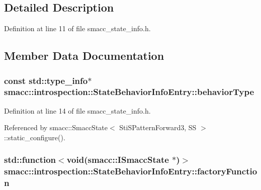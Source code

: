 \subsection{Detailed Description}


Definition at line 11 of file smacc\+\_\+state\+\_\+info.\+h.



\subsection{Member Data Documentation}
\subsubsection[{\texorpdfstring{behavior\+Type}{behaviorType}}]{\setlength{\rightskip}{0pt plus 5cm}const std\+::type\+\_\+info$\ast$ smacc\+::introspection\+::\+State\+Behavior\+Info\+Entry\+::behavior\+Type}\hypertarget{structsmacc_1_1introspection_1_1StateBehaviorInfoEntry_a7817d4924f26f4ef16dfdcf40b78b337}{}\label{structsmacc_1_1introspection_1_1StateBehaviorInfoEntry_a7817d4924f26f4ef16dfdcf40b78b337}


Definition at line 14 of file smacc\+\_\+state\+\_\+info.\+h.



Referenced by smacc\+::\+Smacc\+State$<$ Sti\+S\+Pattern\+Forward3, S\+S $>$\+::static\+\_\+configure().

\subsubsection[{\texorpdfstring{factory\+Function}{factoryFunction}}]{\setlength{\rightskip}{0pt plus 5cm}std\+::function$<$void({\bf smacc\+::\+I\+Smacc\+State} $\ast$)$>$ smacc\+::introspection\+::\+State\+Behavior\+Info\+Entry\+::factory\+Function}\hypertarget{structsmacc_1_1introspection_1_1StateBehaviorInfoEntry_ac7db4e9a687700edb0207ee100aa3576}{}\label{structsmacc_1_1introspection_1_1StateBehaviorInfoEntry_ac7db4e9a687700edb0207ee100aa3576}


